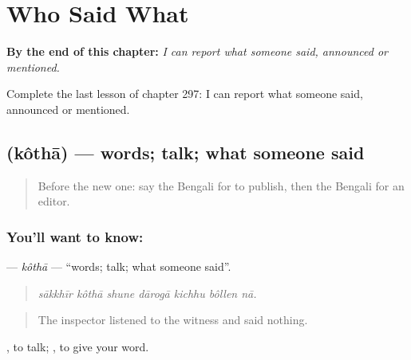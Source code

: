 
\chapter{Who Said What}
\label{ch:bn-who-said-what}

\begin{chapteropening}
\textbf{By the end of this chapter:} \emph{I can report what someone said, announced or mentioned.}

Complete the last lesson of chapter 297: I can report what someone said, announced or mentioned.
\end{chapteropening}

\section[\texorpdfstring{\bn{কথা} (kôthā)}{কথা (kôthā)}]{ (kôthā) — words; talk; what someone said}

\label{lesson:BN-C297-kotha}



\begin{quote}
Before the new one: say the Bengali for to publish, then the Bengali for an editor.
\end{quote}

\subsection*{You'll want to know: }
\textbf{} — \emph{kôthā} — \textquotedblleft{}words; talk; what someone said\textquotedblright{}.

\begin{quote}
      
\end{quote}

\begin{quote}
\emph{sākkhīr kôthā shune dārogā kichhu bôllen nā.}
\end{quote}

\begin{quote}
The inspector listened to the witness and said nothing.
\end{quote}

 , to talk;  , to give your word.

